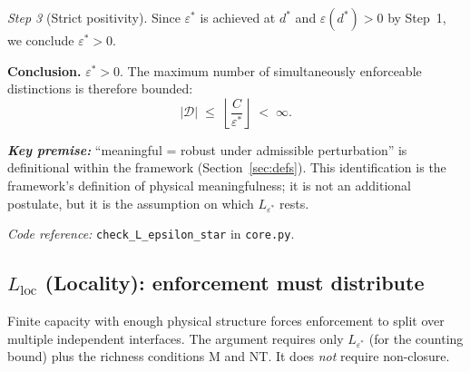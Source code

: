 \documentclass[11pt]{article}
\newcommand{\coderef}[2]{\smallskip\noindent\textit{Code reference:} \texttt{#1} in \texttt{#2}.}
\begin{document}
\begin{tcolorbox}[apfbox, title={Lemma $L_{\varepsilon^*}$ (Minimum Cost)}]
\textit{Step 3} (Strict positivity).  Since $\varepsilon^*$ is achieved at $d^*$ and $\varepsilon(d^*) > 0$ by Step~1, we conclude $\varepsilon^* > 0$.

\smallskip\noindent\textbf{Conclusion.}  $\varepsilon^* > 0$.  The maximum number of simultaneously enforceable distinctions is therefore bounded:
\begin{equation}
|\mathcal{D}| \;\le\; \left\lfloor \frac{C}{\varepsilon^*} \right\rfloor \;<\; \infty.
\end{equation}

\smallskip\noindent\textbf{\textit{Key premise:}} ``meaningful = robust under admissible perturbation'' is definitional within the framework (Section~\ref{sec:defs}).  This identification is the framework's definition of physical meaningfulness; it is not an additional postulate, but it is the assumption on which $L_{\varepsilon^*}$ rests.

\coderef{check\_L\_epsilon\_star}{core.py}
\end{tcolorbox}


\subsection{\texorpdfstring{$L_{\mathrm{loc}}$}{L loc} (Locality): enforcement must distribute}

Finite capacity with enough physical structure forces enforcement to split over multiple independent interfaces.  The argument requires only $L_{\varepsilon^*}$ (for the counting bound) plus the richness conditions M and NT.  It does \emph{not} require non-closure.
\end{document}
